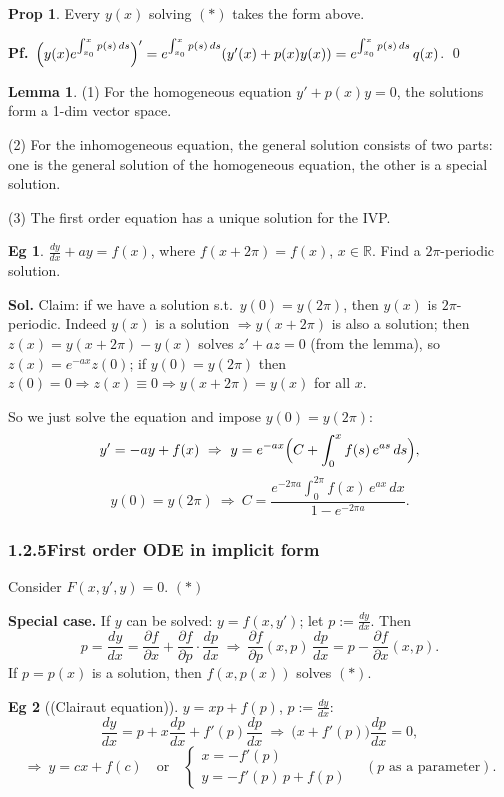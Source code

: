 \documentclass[11pt]{article}
\theoremstyle{definition}
\newtheorem*{proposition}{Prop}
\newtheorem*{lemma}{Lemma}
\newtheorem*{example}{Eg}
\theoremstyle{remark}
\newcommand{\R}{\mathbb{R}}
\newcommand{\subsecn}[1]{\subsubsection*{#1}}
\begin{document}
\begin{proposition}
Every $y(x)$ solving $(*)$ takes the form above.

\textbf{Pf.}\ $\Bigl(y(x)e^{\int_{x_0}^{x} p(s)\,ds}\Bigr)' = e^{\int_{x_0}^{x} p(s)\,ds}(y'(x) + p(x)y(x)) = e^{\int_{x_0}^{x} p(s)\,ds}\,q(x)$. \qed
\end{proposition}

\begin{lemma}
(1) For the homogeneous equation $y' + p(x)y = 0$, the solutions form a 1-dim vector space.

(2) For the inhomogeneous equation, the general solution consists of two parts: one is the general
solution of the homogeneous equation, the other is a special solution.

(3) The first order equation has a unique solution for the IVP.
\end{lemma}

\begin{example}
$\frac{dy}{dx} + ay = f(x)$, where $f(x+2\pi) = f(x)$, $x\in\R$. Find a $2\pi$-periodic solution.

\textbf{Sol.} Claim: if we have a solution s.t.\ $y(0) = y(2\pi)$, then $y(x)$ is $2\pi$-periodic.
Indeed $y(x)$ is a solution $\Rightarrow y(x+2\pi)$ is also a solution; then
$z(x) = y(x+2\pi) - y(x)$ solves $z' + az = 0$ (from the lemma), so $z(x) = e^{-ax}z(0)$; if
$y(0) = y(2\pi)$ then $z(0) = 0 \Rightarrow z(x)\equiv 0 \Rightarrow y(x+2\pi) = y(x)$ for all $x$.

So we just solve the equation and impose $y(0) = y(2\pi)$:
\[
y' = -ay + f(x) \ \Rightarrow\ y = e^{-ax}\Bigl(C + \int_0^x f(s)\,e^{as}\,ds\Bigr),
\]
\[
y(0) = y(2\pi) \ \Rightarrow\ C = \frac{e^{-2\pi a}\int_0^{2\pi} f(x)\,e^{ax}\,dx}{1 - e^{-2\pi a}}.
\]
\end{example}

\subsecn{1.2.5\quad First order ODE in implicit form}

Consider $F(x, y', y) = 0$. \hfill $(*)$

\textbf{Special case.} If $y$ can be solved: $y = f(x, y')$; let $p := \frac{dy}{dx}$. Then
\[
p = \frac{dy}{dx} = \frac{\partial f}{\partial x} + \frac{\partial f}{\partial p}\cdot\frac{dp}{dx}
\ \Rightarrow\ \frac{\partial f}{\partial p}(x,p)\,\frac{dp}{dx} = p - \frac{\partial f}{\partial x}(x,p).
\]
If $p = p(x)$ is a solution, then $f(x, p(x))$ solves $(*)$.

\begin{example}[(Clairaut equation)]
$y = xp + f(p)$, $p := \frac{dy}{dx}$:
\[
\frac{dy}{dx} = p + x\frac{dp}{dx} + f'(p)\frac{dp}{dx}
\ \Rightarrow\ \bigl(x + f'(p)\bigr)\frac{dp}{dx} = 0,
\]
\[
\Rightarrow\ y = cx + f(c) \quad\text{or}\quad
\begin{cases} x = -f'(p) \\ y = -f'(p)\,p + f(p) \end{cases}
\quad (p \text{ as a parameter}).
\]
\end{example}
\end{document}
